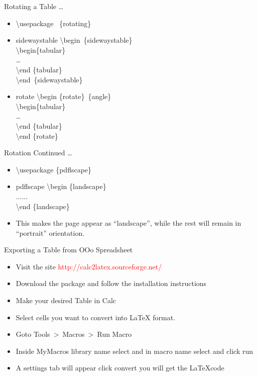 \documentclass{beamer}
\begin{document}
\begin{frame}{Rotating a Table \ldots}
\begin{itemize}
\pause \item \textbackslash usepackage ~\{rotating\}
\pause \item[] \begin{block}{sidewaystable}
\textbackslash begin~\{sidewaystable\}\\
\textbackslash begin\{tabular\} \\
\ldots \\
\textbackslash end \{tabular\}\\
\textbackslash end~\{sidewaystable\}
\end{block}
\pause \item[] \begin{block}{rotate}
\textbackslash begin \{rotate\}~\{angle\}\\
\textbackslash begin\{tabular\} \\
\ldots \\
\textbackslash end \{tabular\}\\
\textbackslash end \{rotate\}
\end{block}
\end{itemize}
\end{frame}

\begin{frame}{Rotation Continued \ldots}
\begin{itemize}
\pause \item \textbackslash usepackage \{pdflscape\}
\pause \item[] \begin{block}{pdflscape}
\textbackslash begin \{landscape\}\\
......\\
\textbackslash end \{landscape\}
\end{block}
\pause \item This makes the page appear as “landscape”, while the rest will remain in “portrait” orientation.
\end{itemize}
\end{frame}
\begin{frame}{Exporting a Table from OOo Spreadsheet}
\begin{itemize}
\pause \item Visit the site \textcolor{red}{http://calc2latex.sourceforge.net/}
\pause \item Download the package and follow the installation instructions
\pause \item Make your desired Table in Calc
\pause \item Select cells you want to convert into LaTeX format.
\pause \item Goto Tools~\textgreater~Macros~\textgreater~Run Macro
\pause \item Inside MyMacros library name select  and in macro name select  and click run
\pause \item A settings tab will appear click convert you will get the \LaTeX code
\end{itemize}
\end{frame}
\end{document}
